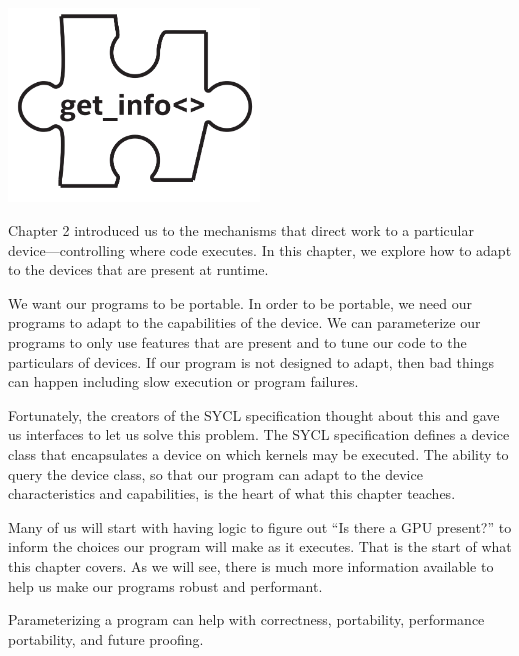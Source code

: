 \begin{center}
	\includegraphics[width=0.5\textwidth]{content/chapter-12/images/1}
\end{center}

Chapter 2 introduced us to the mechanisms that direct work to a particular device—controlling where code executes. In this chapter, we explore how to adapt to the devices that are present at runtime.\par

We want our programs to be portable. In order to be portable, we need our programs to adapt to the capabilities of the device. We can parameterize our programs to only use features that are present and to tune our code to the particulars of devices. If our program is not designed to adapt, then bad things can happen including slow execution or program failures.\par

Fortunately, the creators of the SYCL specification thought about this and gave us interfaces to let us solve this problem. The SYCL specification defines a device class that encapsulates a device on which kernels may be executed. The ability to query the device class, so that our program can adapt to the device characteristics and capabilities, is the heart of what this chapter teaches.\par

Many of us will start with having logic to figure out “Is there a GPU present?” to inform the choices our program will make as it executes. That is the start of what this chapter covers. As we will see, there is much more information available to help us make our programs robust and performant.\par

\begin{tcolorbox}[colback=red!5!white,colframe=red!75!black]
Parameterizing a program can help with correctness, portability, performance portability, and future proofing.
\end{tcolorbox}

